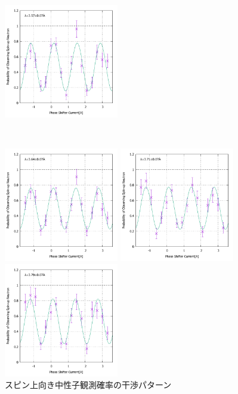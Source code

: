 \begin{figure}[h]
\begin{minipage}{0.33\hsize}
\end{minipage}
\begin{minipage}{0.33\hsize}
\includegraphics[width=5cm]{discussion/IF_rb/Interference_rb_fit500.pdf}
\end{minipage}\\
\begin{minipage}{0.33\hsize}
\includegraphics[width=5cm]{discussion/IF_rb/Interference_rb_fit510.pdf}
\end{minipage}
\begin{minipage}{0.33\hsize}
\includegraphics[width=5cm]{discussion/IF_rb/Interference_rb_fit520.pdf}
\end{minipage}
\begin{minipage}{0.33\hsize}
\includegraphics[width=5cm]{discussion/IF_rb/Interference_rb_fit530.pdf}
\end{minipage}
\caption{スピン上向き中性子観測確率の干渉パターン}\label{Discussion2_fig_IF_rb}
\end{figure}

